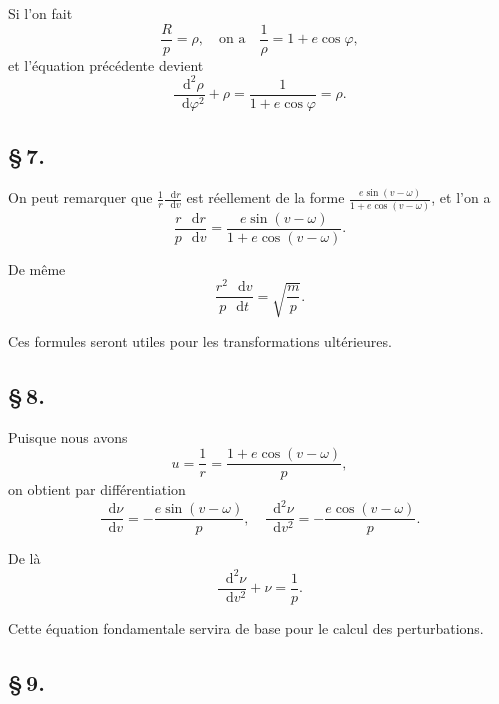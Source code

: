 \documentclass[12pt,a4paper]{article}
\newcommand{\dd}{\mathop{}\!\mathrm{d}}
\begin{document}
Si l'on fait
\[
\frac{R}{p} = \rho, \quad \text{on a} \quad \frac{1}{\rho} = 1 + e\cos\varphi,
\]
et l'\'{e}quation pr\'{e}c\'{e}dente devient
\begin{equation}
\frac{\dd^2\rho}{\dd\varphi^2} + \rho = \frac{1}{1 + e\cos\varphi} = \rho. \tag{37}
\end{equation}

\newpage
\subsection*{\S\,7.}

On peut remarquer que $\frac{1}{r}\frac{\dd r}{\dd v}$ est r\'{e}ellement de la forme $\frac{e\sin(v - \omega)}{1 + e\cos(v - \omega)}$, et l'on a
\begin{equation}
\frac{r\,\dd r}{p\,\dd v} = \frac{e\sin(v - \omega)}{1 + e\cos(v - \omega)}. \tag{38}
\end{equation}

De m\^{e}me
\begin{equation}
\frac{r^2\,\dd v}{p\,\dd t} = \sqrt{\frac{m}{p}}. \tag{39}
\end{equation}

Ces formules seront utiles pour les transformations ult\'{e}rieures.

\newpage
\subsection*{\S\,8.}

Puisque nous avons
\begin{equation}
u = \frac{1}{r} = \frac{1 + e\cos(v - \omega)}{p}, \tag{40}
\end{equation}
on obtient par diff\'{e}rentiation
\begin{equation}
\frac{\dd\nu}{\dd v} = -\frac{e\sin(v - \omega)}{p}, \quad \frac{\dd^2\nu}{\dd v^2} = -\frac{e\cos(v - \omega)}{p}. \tag{41}
\end{equation}

De l\`{a}
\begin{equation}
\frac{\dd^2\nu}{\dd v^2} + \nu = \frac{1}{p}. \tag{42}
\end{equation}

Cette \'{e}quation fondamentale servira de base pour le calcul des perturbations.

\newpage
\subsection*{\S\,9.}
\end{document}
